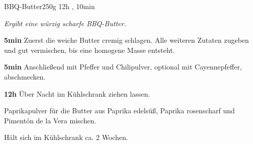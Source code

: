 \documentclass[../recipe-collections/cooking.tex]{subfiles}
\begin{document}
\begin{recipe}{BBQ-Butter}{250g }{12h , 10min }

  \freeform{}\textit{Ergibt eine würzig scharfe BBQ-Butter.}


  \textbf{5min}
  Zuerst die weiche Butter cremig schlagen.
  Alle weiteren Zutaten zugeben und gut vermischen, bis eine homogene Masse entsteht.


  \textbf{5min}
  Anschließend mit Pfeffer und Chilipulver, optional mit Cayennepfeffer, abschmecken.

  \newstep{}\textbf{12h}
  Über Nacht im Kühlschrank ziehen lassen.

  \freeform{}\hrulefill{}

  \freeform{}
  Paprikapulver für die Butter aus Paprika edelsüß, Paprika rosenscharf und Pimentón de la Vera mischen.

  \freeform{}
  Hält sich im Kühlschrank ca. 2 Wochen.

\end{recipe}
\end{document}
